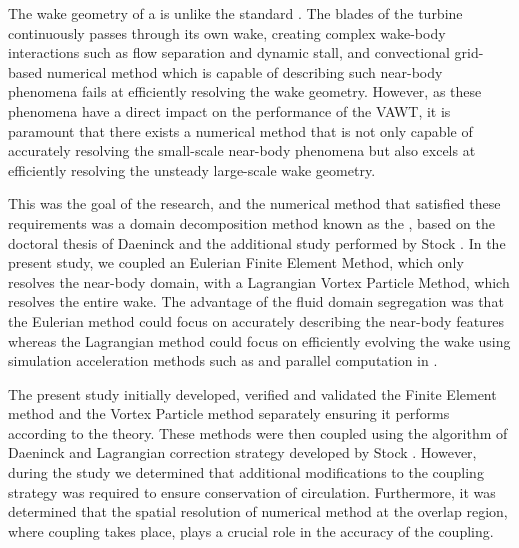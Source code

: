 	The wake geometry of a  is unlike the standard . The blades of the turbine continuously passes through its own wake, creating complex wake-body interactions such as flow separation and dynamic stall, and convectional grid-based numerical method which is capable of describing such near-body phenomena fails at efficiently resolving the wake geometry. However, as these phenomena have a direct impact on the performance of the VAWT, it is paramount that there exists a numerical method that is not only capable of accurately resolving the small-scale near-body phenomena but also excels at efficiently resolving the unsteady large-scale wake geometry.
		
	
	
	This was the goal of the research, and the numerical method that satisfied these requirements was a domain decomposition method known as the , based on the doctoral thesis of Daeninck \cite{Daeninck2006} and the additional study performed by Stock \cite{Stock2010a}. In the present study, we coupled an Eulerian Finite Element Method, which only resolves the near-body domain, with a Lagrangian Vortex Particle Method, which resolves the entire wake. The advantage of the fluid domain segregation was that the Eulerian method could focus on accurately describing the near-body features whereas the Lagrangian method could focus on efficiently evolving the wake using simulation acceleration methods such as  and parallel computation in . 
	

	The present study initially developed, verified and validated the Finite Element method and the Vortex Particle method separately ensuring it performs according to the theory. These methods were then coupled using the algorithm of Daeninck \cite{Daeninck2006} and Lagrangian correction strategy developed by Stock \cite{Stock2010a}. However, during the study we determined that additional modifications to the coupling strategy was required to ensure conservation of circulation. Furthermore, it was determined that the spatial resolution of numerical method at the overlap region, where coupling takes place, plays a crucial role in the accuracy of the coupling. 
	
